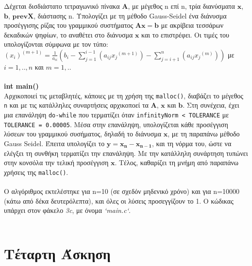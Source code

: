 \documentclass[a4paper, 14pt]{article}   %
\begin{document}
	Δέχεται δισδιάστατο τετραγωνικό πίνακα $\mathbf{A}$, με μέγεθος n επί n, τρία διανύσματα $\mathbf{x}$, $\mathbf{b}$, $\mathbf{prevX}$, διάστασης n. Υπολογίζει με τη μέθοδο Gauss-Seidel ένα διάνυσμα προσέγγισης ρίζας του γραμμικού συστήματος $\mathbf{Α}\mathbf{x}=\mathbf{b}$ με ακρίβεια τεσσάρων δεκαδικών ψηφίων, το αναθέτει στο διάνυσμα $\mathbf{x}$ και το επιστρέφει. Οι τιμές του υπολογίζονται σύμφωνα με τον τύπο:\\
$(x_i)^{(m+1)} = \frac{1}{a_{ii}}( b_i - \sum_{j=1}^{i-1}(a_{ij}{x_j}^{(m+1)}) - \sum_{j=i+1}^{n}({a_{ij}}{x_j}^{(m)}) )$ με $i = 1,..,n$ και $m=1,..$\\\\
\textbf{int main()}\\
Αρχικοποιεί τις μεταβλητές, κάποιες με τη χρήση της \texttt{malloc()}, διαβάζει το μέγεθος \texttt{n} και με τις κατάλληλες συναρτήσεις αρχικοποεί τα $\mathbf{A}$, $\mathbf{x}$ και $\mathbf{b}$. Στη συνέχεια, έχει μια επανάληψη \texttt{do-while} που τερματίζει όταν \texttt{infinityNorm < TOLERANCE} με \texttt{TOLERANCE = 0.00005}. Μέσα στην επανάληψη, υπολογίζεται κάθε προσέγγιση λύσεων του γραμμικού συσήματος, δηλαδή το διάνυσμα $\mathbf{x}$, με τη παραπάνω μέθοδο Gauss Seidel. Έπειτα υπολογίζει το $\mathbf{y}=\mathbf{x_n}-\mathbf{x_{n-1}}$, και τη νόρμα του, ώστε να ελέγξει τη συνθήκη τερματίζει την επανάληψη. Με την κατάλληλη συνάρτηση τυπώνει στην κονσόλα την τελική προσέγγιση $\mathbf{x}$. Τέλος, καθαρίζει τη μνήμη από παραπάνω χρήσεις της \texttt{malloc()}.\\\\
Ο αλγόριθμος εκτελέστηκε για n=10 (σε σχεδόν μηδενικό χρόνο) και για n=10000 (κάτω από δέκα δευτερόλεπτα), και όλες οι λύσεις προσεγγίζουν το 1. Ο κώδικας υπάρχει στον φάκελο \emph{3c}, με όνομα \emph{`main.c`}.\\\\


\section*{Τέταρτη Άσκηση}   %
\end{document}
